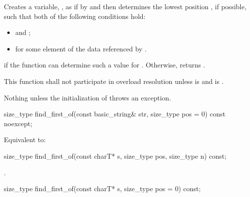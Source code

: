 \begin{itemdescr}
\pnum
\effects
Creates a variable, , as if by
 and then
determines the lowest position , if possible, such that both of
the following conditions hold:

\begin{itemize}
\item
{}
and
;
\item
{}%
for some element  of the data referenced by .
\end{itemize}

\pnum
\returns
{} if the function can determine such a value for .
Otherwise, returns
.

\pnum
\remarks
This function shall not participate in overload resolution unless
 is  and
 is .

\pnum
\throws
Nothing unless the initialization of  throws an exception.
\end{itemdescr}

%
\begin{itemdecl}
size_type find_first_of(const basic_string& str, size_type pos = 0) const noexcept;
\end{itemdecl}

\begin{itemdescr}
\pnum
\effects
Equivalent to: 
\end{itemdescr}

%
\begin{itemdecl}
size_type find_first_of(const charT* s, size_type pos, size_type n) const;
\end{itemdecl}

\begin{itemdescr}
\pnum
\returns
{}.
\end{itemdescr}

%
\begin{itemdecl}
size_type find_first_of(const charT* s, size_type pos = 0) const;
\end{itemdecl}

